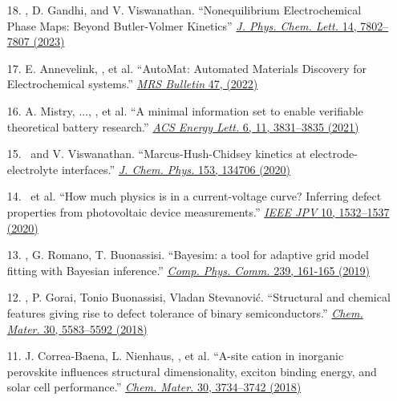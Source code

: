 \begin{enumerate}
        \item[18.] \myname, D. Gandhi, and V. Viswanathan. ``Nonequilibrium Electrochemical Phase Maps: Beyond Butler-Volmer Kinetics'' \href{https://pubs.acs.org/doi/10.1021/acs.jpclett.3c01992}{\textit{J. Phys. Chem. Lett.} 14, 7802--7807 (2023)}

        \item[17.] E. Annevelink\ec, \myname\ec, et al. ``AutoMat: Automated Materials Discovery for Electrochemical systems.'' \href{https://doi.org/10.1557/s43577-022-00424-0}{\textit{MRS Bulletin} 47, (2022)}

        \item[16.] A. Mistry, ..., \myname, et al. ``A minimal information set to enable verifiable theoretical battery research.'' \href{https://pubs.acs.org/doi/10.1021/acsenergylett.1c01710}{\textit{ACS Energy Lett.} 6, 11, 3831--3835 (2021)}

        \item[15.] \myname~and V. Viswanathan. ``Marcus-Hush-Chidsey kinetics at electrode-electrolyte interfaces.'' \href{https://aip.scitation.org/doi/10.1063/5.0023611}{\textit{J. Chem. Phys.} 153, 134706 (2020)}

        \item[14.] \myname~et al. ``How much physics is in a current-voltage curve? Inferring defect properties from photovoltaic device measurements.'' \href{https://ieeexplore.ieee.org/document/9157971}{\textit{IEEE JPV} 10, 1532--1537 (2020)}

        \item[13.] \myname, G. Romano, T. Buonassisi. ``Bayesim: a tool for adaptive grid model fitting with Bayesian inference.'' \href{https://www.sciencedirect.com/science/article/pii/S0010465519300414?via\%3Dihub}{\textit{Comp. Phys. Comm.} 239, 161-165 (2019)}

        \item[12.] \myname\ec, P. Gorai\ec, Tonio Buonassisi, Vladan Stevanovi\'c. ``Structural and chemical features giving rise to defect tolerance of binary semiconductors.'' \href{https://pubs.acs.org/doi/10.1021/acs.chemmater.8b01505}{\textit{Chem. Mater.} 30, 5583--5592 (2018)}

        \item[11.] J. Correa-Baena, L. Nienhaus, \myname, et al. ``A-site cation in inorganic  perovskite influences structural dimensionality, exciton binding energy, and solar cell performance.'' \href{https://pubs.acs.org/doi/10.1021/acs.chemmater.8b00676}{\textit{Chem. Mater.} 30, 3734--3742 (2018)}


\end{enumerate}
